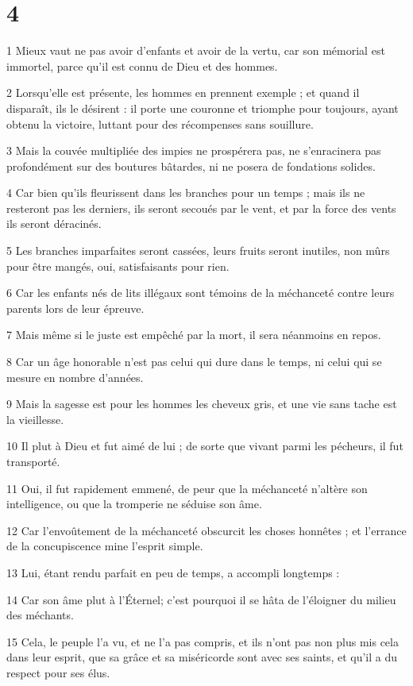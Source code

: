 \chapter{4}

\par 1 Mieux vaut ne pas avoir d'enfants et avoir de la vertu, car son mémorial est immortel, parce qu'il est connu de Dieu et des hommes.
\par 2 Lorsqu'elle est présente, les hommes en prennent exemple ; et quand il disparaît, ils le désirent : il porte une couronne et triomphe pour toujours, ayant obtenu la victoire, luttant pour des récompenses sans souillure.
\par 3 Mais la couvée multipliée des impies ne prospérera pas, ne s'enracinera pas profondément sur des boutures bâtardes, ni ne posera de fondations solides.
\par 4 Car bien qu'ils fleurissent dans les branches pour un temps ; mais ils ne resteront pas les derniers, ils seront secoués par le vent, et par la force des vents ils seront déracinés.
\par 5 Les branches imparfaites seront cassées, leurs fruits seront inutiles, non mûrs pour être mangés, oui, satisfaisants pour rien.
\par 6 Car les enfants nés de lits illégaux sont témoins de la méchanceté contre leurs parents lors de leur épreuve.
\par 7 Mais même si le juste est empêché par la mort, il sera néanmoins en repos.
\par 8 Car un âge honorable n'est pas celui qui dure dans le temps, ni celui qui se mesure en nombre d'années.
\par 9 Mais la sagesse est pour les hommes les cheveux gris, et une vie sans tache est la vieillesse.
\par 10 Il plut à Dieu et fut aimé de lui ; de sorte que vivant parmi les pécheurs, il fut transporté.
\par 11 Oui, il fut rapidement emmené, de peur que la méchanceté n'altère son intelligence, ou que la tromperie ne séduise son âme.
\par 12 Car l'envoûtement de la méchanceté obscurcit les choses honnêtes ; et l'errance de la concupiscence mine l'esprit simple.
\par 13 Lui, étant rendu parfait en peu de temps, a accompli longtemps :
\par 14 Car son âme plut à l'Éternel; c'est pourquoi il se hâta de l'éloigner du milieu des méchants.
\par 15 Cela, le peuple l'a vu, et ne l'a pas compris, et ils n'ont pas non plus mis cela dans leur esprit, que sa grâce et sa miséricorde sont avec ses saints, et qu'il a du respect pour ses élus.
